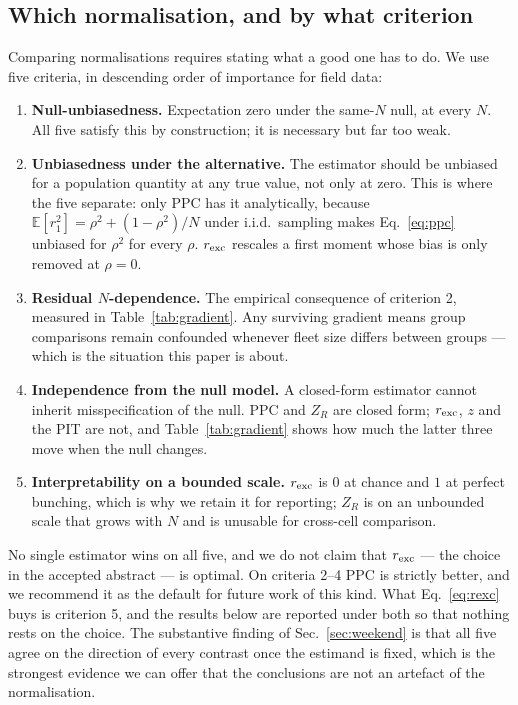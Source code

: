 \documentclass[9pt,twocolumn,twoside]{opticajnl}
\begin{document}
\subsection{Which normalisation, and by what criterion}\label{sec:criterion}

Comparing normalisations requires stating what a good one has to do. We use five criteria, in
descending order of importance for field data:

\begin{enumerate}\itemsep1pt
\item \textbf{Null-unbiasedness.} Expectation zero under the same-$N$ null, at every $N$.
      All five satisfy this by construction; it is necessary but far too weak.
\item \textbf{Unbiasedness under the alternative.} The estimator should be unbiased for a
      population quantity at any true value, not only at zero. This is where the five separate:
      only PPC has it analytically, because $\mathbb{E}[r_1^2] = \rho^2 + (1-\rho^2)/N$ under
      i.i.d.\ sampling makes Eq.~\eqref{eq:ppc} unbiased for $\rho^2$ for every $\rho$.
      $r_{\rm exc}$ rescales a first moment whose bias is only removed at $\rho = 0$.
\item \textbf{Residual $N$-dependence.} The empirical consequence of criterion 2, measured in
      Table~\ref{tab:gradient}. Any surviving gradient means group comparisons remain confounded
      whenever fleet size differs between groups --- which is the situation this paper is about.
\item \textbf{Independence from the null model.} A closed-form estimator cannot inherit
      misspecification of the null. PPC and $Z_R$ are closed form; $r_{\rm exc}$, $z$ and the
      PIT are not, and Table~\ref{tab:gradient} shows how much the latter three move when the
      null changes.
\item \textbf{Interpretability on a bounded scale.} $r_{\rm exc}$ is $0$ at chance and $1$ at
      perfect bunching, which is why we retain it for reporting; $Z_R$ is on an unbounded scale
      that grows with $N$ and is unusable for cross-cell comparison.
\end{enumerate}

\noindent
No single estimator wins on all five, and we do not claim that $r_{\rm exc}$ --- the choice in
the accepted abstract --- is optimal. On criteria 2--4 PPC is strictly better, and we recommend
it as the default for future work of this kind. What Eq.~\eqref{eq:rexc} buys is criterion 5,
and the results below are reported under both so that nothing rests on the choice. The
substantive finding of Sec.~\ref{sec:weekend} is that all five agree on the direction of every
contrast once the estimand is fixed, which is the strongest evidence we can offer that the
conclusions are not an artefact of the normalisation.
\end{document}
